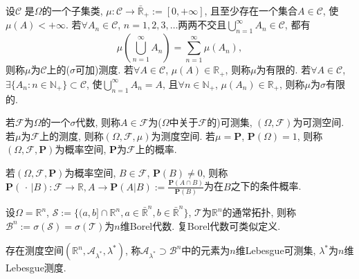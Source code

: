 \begin{definition}
    设$\mathcal{C}$ 是$\Omega$的一个子集类, $\mu:\mathcal{C}\to\bar{\mathbb{R} }_+:=[0,+\infty]$, 且至少存在一个集合$A\in\mathcal{C}$, 使$\mu(A)<+\infty$. 若$\forall A_n\in\mathcal{C}$, $n=1,2,3,\dots$两两不交且$\bigcup_{n=1}^{\infty}A_n\in\mathcal{C}$, 都有\begin{equation*}
        \mu\left(\bigcup_{n=1}^{\infty}A_n\right)=\sum_{n=1}^{\infty}\mu\left(A_n\right),
    \end{equation*}则称$\mu$为$\mathcal{C}$上的($\sigma$可加)测度. 若$\forall A\in\mathcal{C}$, $\mu(A)\in\mathbb{R}_+$, 则称$\mu$为有限的. 若$\forall A\in\mathcal{C}$, $\exists\{A_n:n\in\mathbb{N}_+\}\subset\mathcal{C} $, 使$\bigcup_{n=1}^{\infty}A_n=A$, 且$\forall n\in\mathbb{N}_+$, $\mu(A_n)\in\mathbb{R}_+$, 则称$\mu$为$\sigma$有限的. 
\end{definition}

\begin{definition}
    若$\mathcal{F}$为$\Omega$的一个$\sigma$代数, 则称$A\in\mathcal{F}$为($\Omega$中关于$\mathcal{F}$的)可测集, $(\Omega,\mathcal{F})$为可测空间. 若$\mu$为$\mathcal{F}$上的测度, 则称$(\Omega,\mathcal{F},\mu)$为测度空间. 若$\mu=\mathbf{P}$, $\mathbf{P}(\Omega)=1$, 则称$(\Omega,\mathcal{F},\mathbf{P})$为概率空间, $\mathbf{P}$为$\mathcal{F}$上的概率.
\end{definition}

\begin{definition}
    若$(\Omega,\mathcal{F},\mathbf{P})$为概率空间, $B\in\mathcal{F}$, $\mathbf{P}(B)\ne 0$, 则称$\mathbf{P}(\,\cdot\,|B):\mathcal{F}\to\mathbb{R}, A\to\mathbf{P}(A|B):=\frac{\mathbf{P}(A\cap B)}{\mathbf{P}(B)}$为在$B$之下的条件概率.
\end{definition}

\begin{definition}
    设$\Omega=\mathbb{R}^n$, $\mathscr{S}:=\{(a,b]\cap\mathbb{R}^n,a\in\bar{\mathbb{R}}^n,b\in\bar{\mathbb{R}}^n\}$, $\mathscr{T}$为$\mathbb{R}^n$的通常拓扑, 则称$\mathscr{B}^n:=\sigma(\mathscr{S})=\sigma(\mathscr{T})$为$n$维Borel代数. 复Borel代数可类似定义.
\end{definition}

\begin{definition}
    存在测度空间$(\mathbb{R}^n,\mathscr{A}_{\lambda^*},\lambda^*)$, 称$\mathscr{A}_{\lambda^*}\!\!\supset\!\!\mathscr{B}^n$中的元素为$n$维Lebesgue可测集, $\lambda^*$为$n$维Lebesgue测度.
\end{definition}
